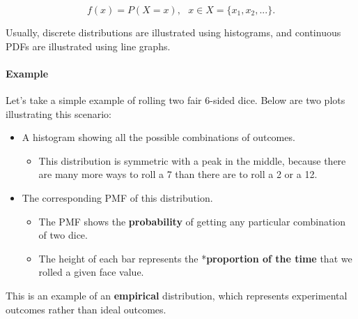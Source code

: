 \documentclass[
]{article}
\providecommand{\tightlist}{%
  \setlength{\itemsep}{0pt}\setlength{\parskip}{0pt}}
\begin{document}
\[f(x) = P(X=x),\ \ \ x \in X = \{x_1, x_2, ...\}.\]

Usually, discrete distributions are illustrated using histograms, and
continuous PDFs are illustrated using line graphs.

\hypertarget{example}{%
\paragraph{Example}\label{example}}

Let's take a simple example of rolling two fair 6-sided dice. Below are
two plots illustrating this scenario:

\begin{itemize}
\tightlist
\item
  A histogram showing all the possible combinations of outcomes.

  \begin{itemize}
  \tightlist
  \item
    This distribution is symmetric with a peak in the middle, because
    there are many more ways to roll a 7 than there are to roll a 2 or a
    12.
  \end{itemize}
\item
  The corresponding PMF of this distribution.

  \begin{itemize}
  \tightlist
  \item
    The PMF shows the \textbf{probability} of getting any particular
    combination of two dice.
  \item
    The height of each bar represents the *\textbf{proportion of the
    time} that we rolled a given face value.
  \end{itemize}
\end{itemize}

This is an example of an \textbf{empirical} distribution, which
represents experimental outcomes rather than ideal outcomes.
\end{document}
